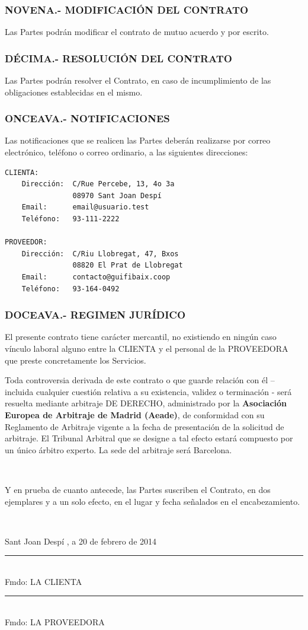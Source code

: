 \documentclass[11pt,spanish,a4paper,]{article}
\newcommand{\doubleSignature}[4]{%
  \parbox{\textwidth}{
    #3, a #4\\
    \vspace{3cm}

    \parbox{7cm}{
      \centering
      \rule{6cm}{1pt}\\
       Fmdo: #1 
    }
    \hfill
    \parbox{7cm}{
      \centering
      \rule{6cm}{1pt}\\
      Fmdo: #2
    }
  }
}
\begin{document}
\subsubsection{NOVENA.- MODIFICACIÓN DEL
CONTRATO}\label{novena.--modificaciuxf3n-del-contrato}

Las Partes podrán modificar el contrato de mutuo acuerdo y por escrito.

\subsubsection{DÉCIMA.- RESOLUCIÓN DEL
CONTRATO}\label{duxe9cima.--resoluciuxf3n-del-contrato}

Las Partes podrán resolver el Contrato, en caso de incumplimiento de las
obligaciones establecidas en el mismo.

\subsubsection{ONCEAVA.- NOTIFICACIONES}\label{onceava.--notificaciones}

Las notificaciones que se realicen las Partes deberán realizarse por
correo electrónico, teléfono o correo ordinario, a las siguientes
direcciones:

\begin{verbatim}
CLIENTA:
    Dirección:  C/Rue Percebe, 13, 4o 3a
                08970 Sant Joan Despí
    Email:      email@usuario.test
    Teléfono:   93-111-2222

PROVEEDOR:
    Dirección:  C/Riu Llobregat, 47, Bxos
                08820 El Prat de Llobregat
    Email:      contacto@guifibaix.coop
    Teléfono:   93-164-0492
\end{verbatim}

\subsubsection{DOCEAVA.- REGIMEN
JURÍDICO}\label{doceava.--regimen-juruxeddico}

El presente contrato tiene carácter mercantil, no existiendo en ningún
caso vínculo laboral alguno entre la CLIENTA y el personal de la
PROVEEDORA que preste concretamente los Servicios.

Toda controversia derivada de este contrato o que guarde relación con él
-- incluida cualquier cuestión relativa a su existencia, validez o
terminación - será resuelta mediante arbitraje DE DERECHO, administrado
por la \textbf{Asociación Europea de Arbitraje de Madrid (Aeade)}, de
conformidad con su Reglamento de Arbitraje vigente a la fecha de
presentación de la solicitud de arbitraje. El Tribunal Arbitral que se
designe a tal efecto estará compuesto por un único árbitro experto. La
sede del arbitraje será Barcelona.

~

Y en prueba de cuanto antecede, las Partes suscriben el Contrato, en dos
ejemplares y a un solo efecto, en el lugar y fecha señalados en el
encabezamiento.

~

\doubleSignature{ LA CLIENTA }{ LA PROVEEDORA }{ Sant Joan Despí }{20 de febrero de 2014}
\end{document}
